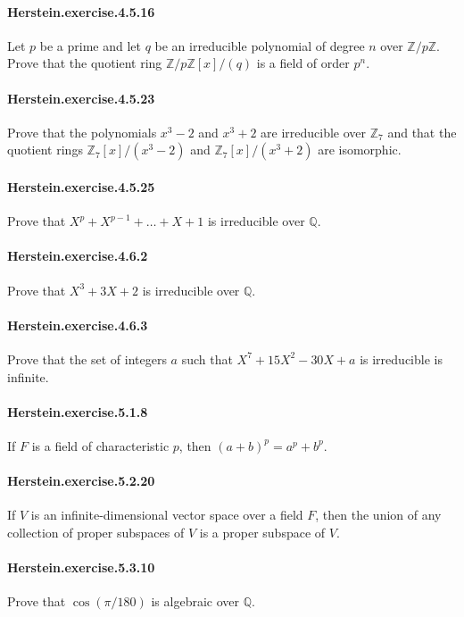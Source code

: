 \documentclass{article}
\begin{document}
\paragraph{Herstein.exercise.4.5.16} Let $p$ be a prime and let $q$ be an irreducible polynomial of degree $n$ over $\mathbb{Z}/p\mathbb{Z}$. Prove that the quotient ring $\mathbb{Z}/p\mathbb{Z}[x]/(q)$ is a field of order $p^n$.

\paragraph{Herstein.exercise.4.5.23} Prove that the polynomials $x^3-2$ and $x^3+2$ are irreducible over $\mathbb{Z}_7$ and that the quotient rings $\mathbb{Z}_7[x]/(x^3-2)$ and $\mathbb{Z}_7[x]/(x^3+2)$ are isomorphic.

\paragraph{Herstein.exercise.4.5.25} Prove that $X^p + X^{p-1} + \dots + X + 1$ is irreducible over $\mathbb{Q}$.

\paragraph{Herstein.exercise.4.6.2} Prove that $X^3 + 3X + 2$ is irreducible over $\mathbb{Q}$.

\paragraph{Herstein.exercise.4.6.3} Prove that the set of integers $a$ such that $X^7 + 15X^2 - 30X + a$ is irreducible is infinite.

\paragraph{Herstein.exercise.5.1.8} If $F$ is a field of characteristic $p$, then $(a+b)^p = a^p + b^p$.

\paragraph{Herstein.exercise.5.2.20} If $V$ is an infinite-dimensional vector space over a field $F$, then the union of any collection of proper subspaces of $V$ is a proper subspace of $V$.

\paragraph{Herstein.exercise.5.3.10} Prove that $\cos(\pi/180)$ is algebraic over $\mathbb{Q}$.
\end{document}

